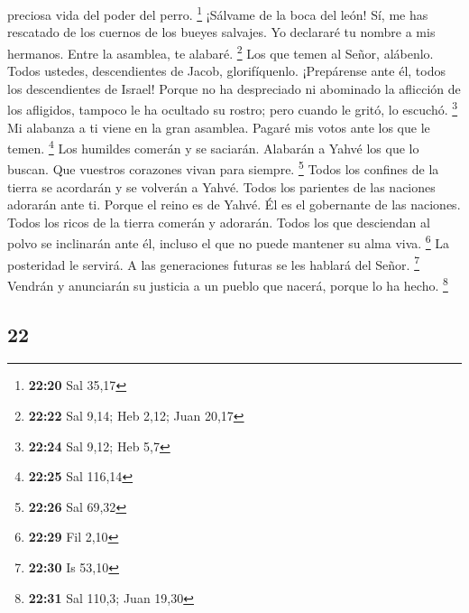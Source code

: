 \begin{paracol}{2}
preciosa vida del poder del perro. \footnote{\textbf{22:20} Sal 35,17}
 ¡Sálvame de la boca del león! Sí, me has rescatado de
los cuernos de los bueyes salvajes.  Yo declararé tu
nombre a mis hermanos. Entre la asamblea, te alabaré. \footnote{\textbf{22:22}
  Sal 9,14; Heb 2,12; Juan 20,17}  Los que temen al
Señor, alábenlo. Todos ustedes, descendientes de Jacob, glorifíquenlo.
¡Prepárense ante él, todos los descendientes de Israel! 
Porque no ha despreciado ni abominado la aflicción de los afligidos,
tampoco le ha ocultado su rostro; pero cuando le gritó, lo escuchó.
\footnote{\textbf{22:24} Sal 9,12; Heb 5,7}  Mi alabanza
a ti viene en la gran asamblea. Pagaré mis votos ante los que le temen.
\footnote{\textbf{22:25} Sal 116,14}  Los humildes
comerán y se saciarán. Alabarán a Yahvé los que lo buscan. Que vuestros
corazones vivan para siempre. \footnote{\textbf{22:26} Sal 69,32}
 Todos los confines de la tierra se acordarán y se
volverán a Yahvé. Todos los parientes de las naciones adorarán ante ti.
 Porque el reino es de Yahvé. Él es el gobernante de las
naciones.  Todos los ricos de la tierra comerán y
adorarán. Todos los que desciendan al polvo se inclinarán ante él,
incluso el que no puede mantener su alma viva. \footnote{\textbf{22:29}
  Fil 2,10}  La posteridad le servirá. A las generaciones
futuras se les hablará del Señor. \footnote{\textbf{22:30} Is 53,10}
 Vendrán y anunciarán su justicia a un pueblo que nacerá,
porque lo ha hecho. \footnote{\textbf{22:31} Sal 110,3; Juan 19,30}

\switchcolumn
\begin{otherlanguage}{english}

\hypertarget{section-43}{%
\section{22}\label{section-43}}


\end{otherlanguage}
\end{paracol}
